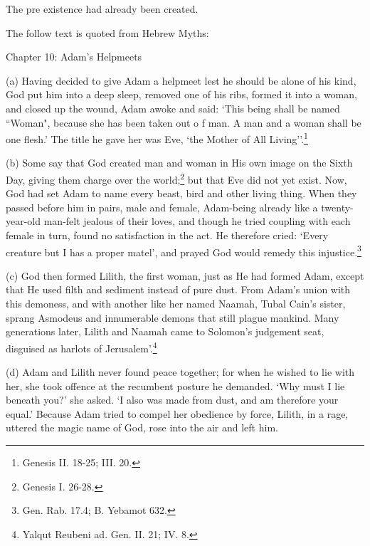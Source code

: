\documentclass{article}
\begin{document}
The pre existence had already been created.

The follow text is quoted from Hebrew Myths\cite{myth}:

Chapter 10: Adam's Helpmeets

(a) Having decided to give Adam a helpmeet lest he should be alone
of his kind, God put him into a deep sleep, removed one of his
ribs, formed it into a woman, and closed up the wound, Adam awoke
and said: `This being shall be named ``Woman", because she has been
taken out o f man. A man and a woman shall be one flesh.' The
title he gave her was Eve, `the Mother of 
All Living''.\footnote{Genesis II. 18-25; III. 20.}

(b) Some say that God created man and woman in His own image on
the Sixth Day, giving them charge over the 
world;\footnote{Genesis I. 26-28.} but that Eve
did not yet exist. Now, God had set Adam to name every beast, bird
and other living thing. When they passed before him in pairs, male
and female, Adam-being already like a twenty-year-old man-felt
jealous of their loves, and though he tried coupling with each
female in turn, found no satisfaction in the act. He therefore
cried: `Every creature but I has a proper matel', and prayed God
would remedy this injustice.\footnote{Gen. Rab. 17.4; B. Yebamot 632.}

(c) God then formed Lilith, the first woman, just as He had
formed Adam, except that He used filth and sediment instead of
pure dust. From Adam's union with this demoness, and with another
like her named Naamah, Tubal Cain's sister, sprang Asmodeus and
innumerable demons that still plague mankind. Many generations
later, Lilith and Naamah came to Solomon's judgement seat,
disguised as harlots of 
Jerusalem'.\footnote{Yalqut Reubeni ad. Gen. II. 21; IV. 8.}

(d) Adam and Lilith never found peace together; for when he
wished to lie with her, she took offence at the recumbent posture
he demanded. `Why must I lie beneath you?' she asked. `I also was
made from dust, and am therefore your equal.' Because Adam tried
to compel her obedience by force, Lilith, in a rage, uttered the
magic name of God, rose into the air and left him.
\end{document}
